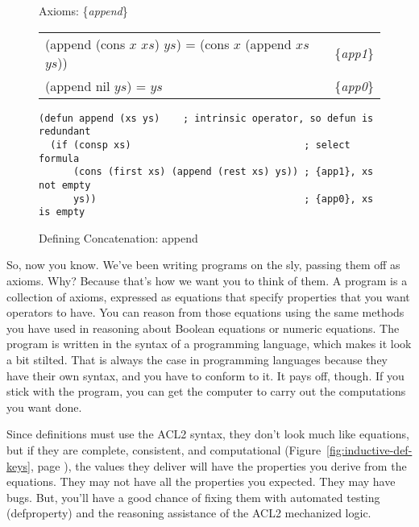 \begin{figure}
\begin{center}
Axioms: \{\emph{append}\} \\
\begin{tabular}{ll}
(append (cons $x$ $xs$) $ys$) = (cons $x$ (append $xs$ $ys$)) & \{\emph{app1}\} \\
(append nil $ys$) =  $ys$                                     & \{\emph{app0}\} \\
\end{tabular}
\begin{Verbatim}
(defun append (xs ys)    ; intrinsic operator, so defun is redundant
  (if (consp xs)                              ; select formula
      (cons (first xs) (append (rest xs) ys)) ; {app1}, xs not empty
      ys))                                    ; {app0}, xs is empty
\end{Verbatim}
\end{center}
\caption{Defining Concatenation: append}
\label{fig:append-defun}
\end{figure}

So, now you know. We've been writing
programs
on the sly, passing them off as axioms.
Why? Because that's how we want you to think of them.
A program is a collection of axioms, expressed as equations
that specify properties that you want operators to have.
You can reason from those equations using the same methods
you have used in reasoning about Boolean equations or numeric equations.
The program is written in the syntax of a programming language,
which makes it look a bit stilted.
That is always the case in programming languages because
they have their own syntax, and you have to conform to it.
It pays off, though.
If you stick with the program, you can get the computer to carry out
the computations you want done.

Since definitions must use the ACL2 syntax,
they don't look much like equations,
but if they are complete, consistent, and computational
(Figure~\ref{fig:inductive-def-keys}, page \pageref{fig:inductive-def-keys}),
the values they deliver will have the properties you derive
from the equations.
They may not have all the properties you expected.
They may have bugs.
But, you'll have a good chance of fixing them with
automated testing (defproperty)
and the reasoning assistance of the ACL2 mechanized logic.

